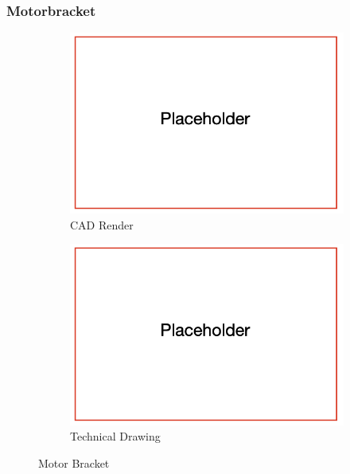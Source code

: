 \subsubsection{Motorbracket}

\begin{figure}[ht!]
  \centering
  \begin{subfigure}{.5\textwidth}
    \centering
    \includegraphics[width=\linewidth]{texfiles/mech/eimg/propulsion/placeholder}
    \caption{CAD Render}
    \label{fig:CAD Motorbracket}
  \end{subfigure}%
  \begin{subfigure}{.5\textwidth}
    \centering
    \includegraphics[width=\linewidth]{texfiles/mech/eimg/propulsion/placeholder}
    \caption{Technical Drawing}
    \label{fig:TD Motorbracket}
  \end{subfigure}
  \caption{Motor Bracket}
  \label{fig:Motorbracket}
\end{figure}

